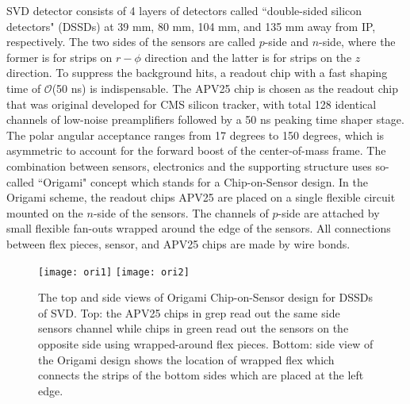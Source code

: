 SVD detector consists of 4 layers of detectors called  ``double-sided silicon detectors" (DSSDs) at 39 mm, 80 mm, 104 mm, and 135 mm away from IP, respectively. The two sides of the sensors are called $p$-side and $n$-side, where the former is for strips on $r-\phi$ direction and the latter is for strips on the $z$ direction. To suppress the background hits, a readout chip with a fast shaping time of $\mathcal{O}$(50 ns) is indispensable. The APV25 chip\cite{french2001design} is chosen as the readout chip that was original developed for CMS silicon tracker, with total 128 identical channels of low-noise preamplifiers followed by a 50 ns peaking time shaper stage. The polar angular acceptance ranges from 17 degrees to 150 degrees, which is asymmetric to account for the
forward boost of the center-of-mass frame. The combination between sensors, electronics and the supporting structure uses so-called ``Origami" concept which stands for a Chip-on-Sensor design. In the Origami scheme, the readout chips APV25 are placed on a single flexible circuit mounted on the $n$-side of the sensors. The channels of $p$-side are attached by small flexible fan-outs wrapped around the edge of the sensors. All connections between flex pieces, sensor, and APV25 chips are
made by wire bonds.
\begin{figure}[htpb]
	\centering
	\texttt{[image: ori1]}
	\texttt{[image: ori2]}
	\caption{The top and side views of Origami Chip-on-Sensor design for DSSDs of SVD. Top: the APV25 chips in grep read out the same side sensors channel while chips in green read out the sensors on the opposite side using wrapped-around flex pieces. Bottom: side view of the Origami design shows the location of wrapped flex which connects the strips of the bottom sides which are placed at the left edge.\cite{Abe:2010gxa}}
	\label{fig:origami}
\end{figure}



